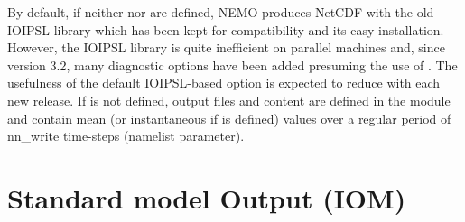\documentclass[NEMO_book]{subfiles}
\begin{document}
By default, if neither  nor  are defined, NEMO produces NetCDF with the old IOIPSL library which has been kept for compatibility and its easy installation. However, the IOIPSL library is quite inefficient on parallel machines and, since version 3.2, many diagnostic options have been added presuming the use of . The usefulness of the default IOIPSL-based option is expected to reduce with each new release. If  is not defined, output files and content are defined in the  module and contain mean (or instantaneous if  is defined) values over a regular period of nn\_write time-steps (namelist parameter). 


\section{Standard model Output (IOM)}
\label{DIA_iom}
\end{document}
